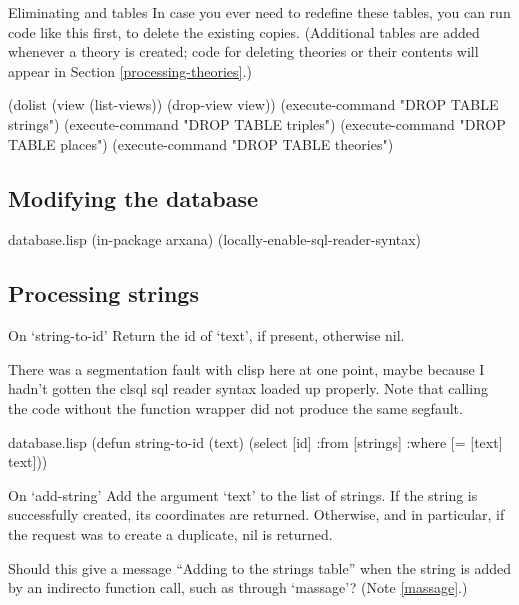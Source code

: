 \begin{notate}{Eliminating and tables}
In case you ever need to redefine these tables, you can
run code like this first, to delete the existing copies.
(Additional tables are added whenever a theory is created;
code for deleting theories or their contents will appear
in Section \ref{processing-theories}.)
\end{notate}

\begin{idea}
(dolist (view (list-views)) (drop-view view))
(execute-command "DROP TABLE strings")
(execute-command "DROP TABLE triples")
(execute-command "DROP TABLE places")
(execute-command "DROP TABLE theories")
\end{idea}

\subsection{Modifying the database}

\begin{common}{database.lisp}
(in-package arxana)
(locally-enable-sql-reader-syntax)
\end{common}

\subsection*{Processing strings}

\begin{notate}{On `string-to-id'}
Return the id of `text', if present, otherwise nil.

There was a segmentation fault with clisp here at one
point, maybe because I hadn't gotten the clsql sql reader
syntax loaded up properly.  Note that calling the code
without the function wrapper did not produce the same
segfault.
\end{notate}

\begin{common}{database.lisp}
(defun string-to-id (text)
  (select [id]
          :from [strings]
          :where [= [text] text]))
\end{common}

\begin{notate}{On `add-string'} \label{add-string}
Add the argument `text' to the list of strings.  If the string
is successfully created, its coordinates are returned.
Otherwise, and in particular, if the request was to create
a duplicate, nil is returned.

Should this give a message ``Adding  to the
strings table'' when the string is added by an indirecto
function call, such as through `massage'?
(Note \ref{massage}.)
\end{notate}

